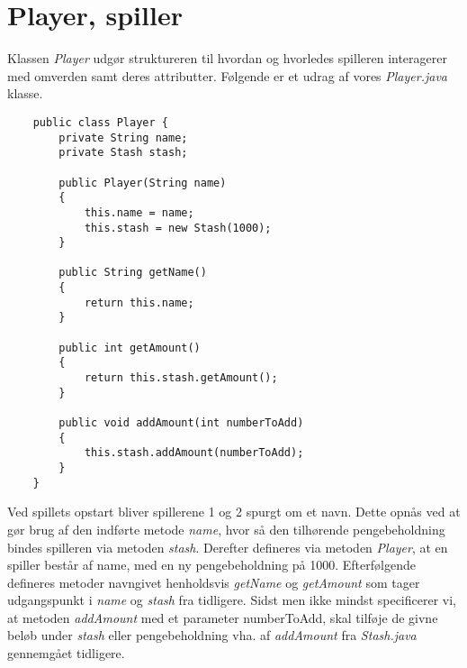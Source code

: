 \section{Player, spiller}
\noindent Klassen \textit{Player} udgør struktureren til hvordan og hvorledes spilleren interagerer med omverden samt deres attributter.
Følgende er et udrag af vores \textit{Player.java} klasse.\\
\begin{lstlisting}
    public class Player {
        private String name;
        private Stash stash;
    
        public Player(String name)
        {
            this.name = name;
            this.stash = new Stash(1000);
        }
    
        public String getName()
        {
            return this.name;
        }
    
        public int getAmount()
        {
            return this.stash.getAmount();
        }
    
        public void addAmount(int numberToAdd)
        {
            this.stash.addAmount(numberToAdd);
        }
    }     
\end{lstlisting}
\vspace{2ex}

\noindent Ved spillets opstart bliver spillerene 1 og 2 spurgt om et navn.
Dette opnås ved at gør brug af den indførte metode \textit{name}, hvor så den tilhørende pengebeholdning bindes spilleren via metoden \textit{stash}.
Derefter defineres via metoden \textit{Player}, at en spiller består af name, med en ny pengebeholdning på 1000.
Efterfølgende defineres metoder navngivet henholdsvis \textit{getName} og \textit{getAmount} som tager udgangspunkt i \textit{name} og \textit{stash} fra tidligere.
Sidst men ikke mindst specificerer vi, at metoden \textit{addAmount} med et parameter {numberToAdd}, skal tilføje de givne beløb under \textit{stash} eller pengebeholdning vha. af \textit{addAmount} fra \textit{Stash.java} gennemgået tidligere.\\

